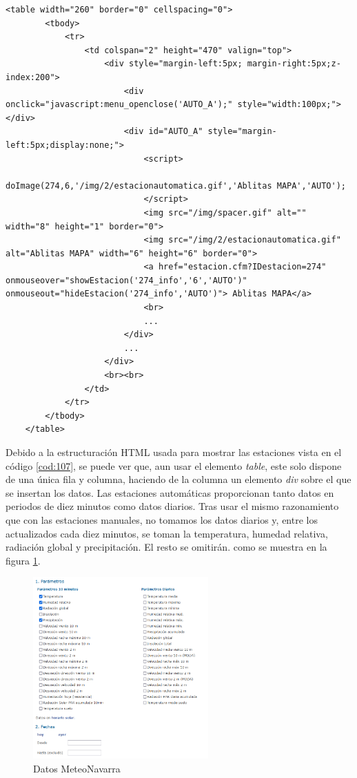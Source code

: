 \begin{lstlisting}[basicstyle=\footnotesize, caption={HTML tabla estaciones en MeteoNavarra}, label=cod:107]
	<table width="260" border="0" cellspacing="0">
		<tbody>
			<tr>
				<td colspan="2" height="470" valign="top">
					<div style="margin-left:5px; margin-right:5px;z-index:200">
						<div onclick="javascript:menu_openclose('AUTO_A');" style="width:100px;"></div>
						<div id="AUTO_A" style="margin-left:5px;display:none;">
							<script>
								doImage(274,6,'/img/2/estacionautomatica.gif','Ablitas MAPA','AUTO');
							</script>
							<img src="/img/spacer.gif" alt="" width="8" height="1" border="0">
							<img src="/img/2/estacionautomatica.gif" alt="Ablitas MAPA" width="6" height="6" border="0">
							<a href="estacion.cfm?IDestacion=274" onmouseover="showEstacion('274_info','6','AUTO')" onmouseout="hideEstacion('274_info','AUTO')"> Ablitas MAPA</a>
							<br>
							...
						</div>
						...
					</div>
					<br><br>
				</td>
			</tr>
		</tbody>
	</table>
\end{lstlisting}

Debido a la estructuración HTML usada para mostrar las estaciones vista en el código \ref{cod:107}, se puede ver que, aun usar el elemento \textit{table}, este solo dispone de una única fila y columna, haciendo de la columna un elemento \textit{div} sobre el que se insertan los datos.\newline
\newline
Las estaciones automáticas proporcionan tanto datos en periodos de diez minutos como datos diarios. Tras usar el mismo razonamiento que con las estaciones manuales, no tomamos los datos diarios y, entre los actualizados cada diez minutos, se toman la temperatura, humedad relativa, radiación global y precipitación. El resto se omitirán. como se muestra en la figura \ref{fig:ej6}.

\begin{figure} [H]
	\centering
	\includegraphics[width=0.6\textwidth]{fig/DatosMeteoNavarra.png}
	\caption[Apartado selección de datos MeteoNavarra]{Datos MeteoNavarra}
	\label{fig:ej6}
\end{figure}

